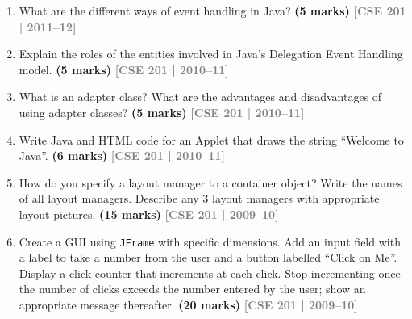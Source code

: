 \documentclass[12pt,a3paper]{article}
\newcommand{\yr}[1]{\hfill\textcolor{gray}{\small\textbf{[#1]}}}
\newcommand{\mk}[1]{\textcolor{orange!70!black}{\small\textbf{(#1 marks)}}}
\begin{document}
\begin{enumerate}




\item What are the different ways of event handling in Java? \mk{5}
\yr{CSE 201 | 2011--12}






\item Explain the roles of the entities involved in Java's Delegation Event Handling model. \mk{5}
\yr{CSE 201 | 2010--11}





\item What is an adapter class? What are the advantages and disadvantages of using adapter classes? \mk{5}
\yr{CSE 201 | 2010--11}





\item Write Java and HTML code for an Applet that draws the string ``Welcome to Java''. \mk{6}
\yr{CSE 201 | 2010--11}





\item How do you specify a layout manager to a container object? Write the names of all layout managers. Describe any 3 layout managers with appropriate layout pictures. \mk{15}
\yr{CSE 201 | 2009--10}





\item Create a GUI using \texttt{JFrame} with specific dimensions. Add an input field with a label to take a number from the user and a button labelled ``Click on Me''. Display a click counter that increments at each click. Stop incrementing once the number of clicks exceeds the number entered by the user; show an appropriate message thereafter. \mk{20}
\yr{CSE 201 | 2009--10}







\end{enumerate}
\end{document}
